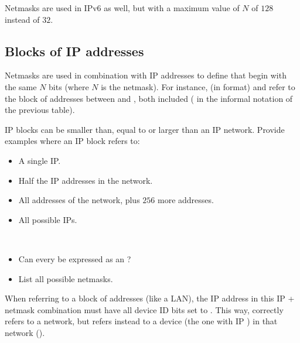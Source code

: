 \begin{remark}
Netmasks are used in IPv6 as well, but with a maximum value of $N$ of $128$ instead of $32$.
\end{remark}

\subsection{Blocks of IP addresses}\label{sec:layer3:ip_blocks}

Netmasks are used in combination with IP addresses to define 
that begin with the same $N$ bits (where $N$ is the netmask).
% 
For instance,  (in  format) 
and  refer to the block 
of addresses between  and ,
both included
( in the informal notation of the previous table).

\begin{exercise} 
IP blocks can be smaller than, equal to or larger than an IP network.
Provide examples where an IP block refers to:
\begin{itemize}
\item A single IP.
\item Half the IP addresses in the  network.
\item All addresses of the  network, plus 
      $256$ more addresses.
\item All possible IPs.
\end{itemize}
\end{exercise}


\begin{exercise}\ \\[-0.65cm]
\begin{itemize}
\item Can every  be expressed as an ?
\item List all possible netmasks.\\[-0.5cm]
\end{itemize}
\end{exercise}

When referring to a block of addresses (like a LAN), 
the IP address in this IP + netmask combination
must have all device ID bits set to . 
This way,  correctly refers to a network, but
 refers instead to a device 
(the one with IP ) in that network ().


